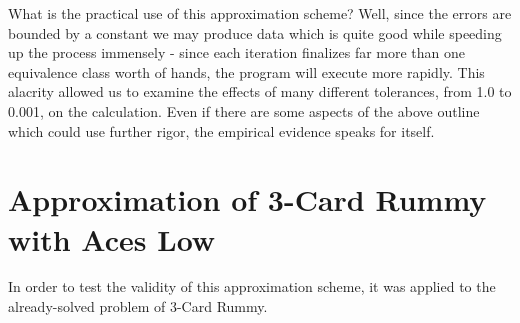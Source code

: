 \documentclass[paper=a4, fontsize=11pt,twoside]{report}   %
\begin{document}
What is the practical use of this approximation scheme? Well, since the errors are bounded by a constant we may produce data which is quite good while speeding up the process immensely - since each iteration finalizes far more than one equivalence class worth of hands, the program will execute more rapidly. This alacrity allowed us to examine the effects of many different tolerances, from 1.0 to 0.001, on the calculation. Even if there are some aspects of the above outline which could use further rigor, the empirical evidence speaks for itself.
 
\section{Approximation of 3-Card Rummy with Aces Low}

In order to test the validity of this approximation scheme, it was applied to the already-solved problem of 3-Card Rummy. 

\end{document}
